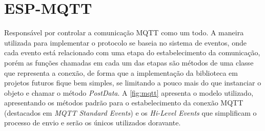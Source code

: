 \section{ESP-MQTT}

Responsável por controlar a comunicação \ac{MQTT} como um todo. A maneira utilizada para implementar o protocolo se 
baseia no sistema de eventos, onde cada evento está relacionado com uma etapa do estabelecimento da comunicação, 
porém as funções chamadas em cada um das etapas são métodos de uma classe que representa a conexão, de forma que 
a implementação da biblioteca em projetos futuros fique bem simples, se limitando a pouco mais do que instanciar o 
objeto e chamar o método \textit{PostData}. A \autoref{fig:mqtt} apresenta o modelo utilizado, apresentando os métodos
padrão para o estabelecimento da conexão \ac{MQTT} (destacados em \textit{MQTT Standard Events}) e os \textit{Hi-Level Events}
que simplificam o processo de envio e serão os únicos utilizados doravante.


